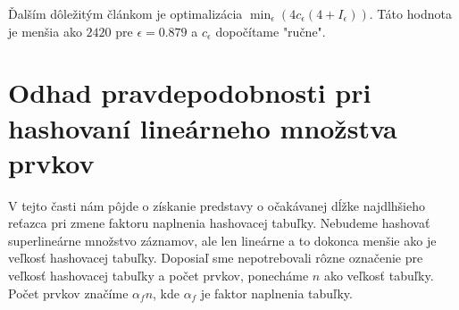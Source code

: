 Ďalším dôležitým článkom je optimalizácia $\min_\epsilon(4 c_\epsilon (4 + I_{\epsilon}))$. Táto hodnota je menšia ako $2420$ pre $\epsilon = 0.879$ a $c_\epsilon$ dopočítame "ručne".

\section{Odhad pravdepodobnosti pri hashovaní li\-ne\-ár\-ne\-ho množstva prvkov}
V tejto časti nám pôjde o získanie predstavy o očakávanej dĺžke najdlhšieho reťazca pri zmene faktoru naplnenia hashovacej tabuľky. Nebudeme hashovať superlineárne množstvo záznamov, ale len lineárne a to dokonca menšie ako je veľkosť hashovacej tabuľky. Doposiaľ sme nepotrebovali rôzne označenie pre veľkosť hashovacej tabuľky a počet prvkov, ponecháme $n$ ako veľkosť tabuľky. Počet prvkov značíme $\alpha_f n$, kde $\alpha_f$ je faktor naplnenia tabuľky.

